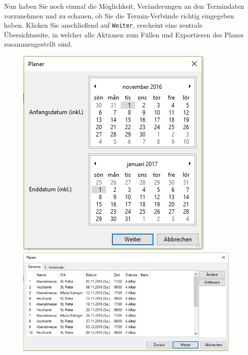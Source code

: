 \documentclass[a4paper,11pt]{article}
\begin{document}
Nun haben Sie noch einmal die Möglichkeit, Veränderungen an den Termindaten vorzunehmen und zu schauen, ob Sie die Termin-Verbünde richtig eingegeben haben. Klicken Sie anschließend auf \texttt{Weiter}, erscheint eine zentrale Übersichtsseite, in welcher alle Aktionen zum Füllen und Exportieren des Planes zusammengestellt sind.
\begin{figure}[ht]
\includegraphics[scale=0.52]{planer_zeitraum2.PNG}
\includegraphics[scale=0.52]{planer_termine2.PNG}
\end{figure}

\pagebreak
\end{document}
